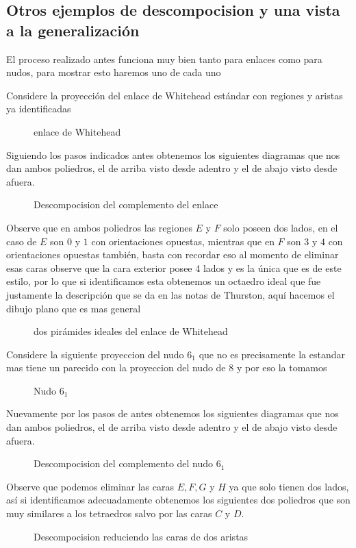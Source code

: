 \subsection{Otros ejemplos de descompocision y una vista a la generalización}
El proceso realizado antes funciona muy bien tanto para enlaces como para nudos, para mostrar esto haremos uno de cada uno
\begin{eg}
    Considere la proyección del enlace de Whitehead estándar con regiones y aristas ya identificadas
    \begin{figure}[H]
    \centering
    
        \caption{enlace de Whitehead}
    \end{figure}
    Siguiendo los pasos indicados antes obtenemos los siguientes diagramas que nos dan ambos poliedros, el de arriba visto desde adentro y el de abajo visto desde afuera.
    \begin{figure}[H]
    \centering
    
        \caption{Descompocision del complemento del enlace}
    \end{figure}
    Observe que en ambos poliedros las regiones $E$ y $F$ solo poseen dos lados, en el caso de $E$ son $0$ y $1$ con orientaciones opuestas, mientras que en $F$ son $3$ y $4$ con orientaciones opuestas también, basta con recordar eso al momento de eliminar esas caras observe que la cara exterior posee 4 lados y es la única que es de este estilo, por lo que si identificamos esta obtenemos un octaedro ideal que fue justamente la descripción que se da en las notas de Thurston, aquí hacemos el dibujo plano que es mas general
    \begin{figure}[H]
     \centering
    
        \caption{dos pirámides ideales del enlace de Whitehead}
    \end{figure}
\end{eg}
\begin{eg}
    Considere la siguiente proyeccion del nudo $6_1$ que no es precisamente la estandar mas tiene un parecido con la proyeccion del nudo de 8 y por eso la tomamos
    \begin{figure}[H]
    \centering
    
        \caption{Nudo $6_1$}
    \end{figure}
   Nuevamente por los pasos de antes obtenemos los siguientes diagramas que nos dan ambos poliedros, el de arriba visto desde adentro y el de abajo visto desde afuera.
    \begin{figure}[H]
    
        \caption{Descompocision del complemento del nudo $6_1$}
    \end{figure}
    Observe que podemos eliminar las caras $E,F,G$ y $H$ ya que solo tienen dos lados, así si identificamos adecuadamente obtenemos los siguientes dos poliedros que son muy similares a los tetraedros salvo por las caras $C$ y $D$.
    \begin{figure}[H]
    \centering
    
        \caption{Descompocision reduciendo las caras de dos aristas}
    \end{figure}
    
\end{eg}
